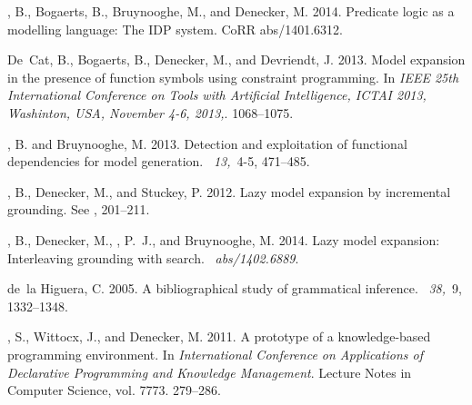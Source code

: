 \documentclass{tlp}
\renewcommand{\|}{\ensuremath{\,|\,}}
\renewcommand{\|}{\,|\,}
\begin{document}
\begin{thebibliography}{}
{, B.}, {\sc Bogaerts, B.}, {\sc Bruynooghe, M.}, {\sc and} {\sc
  Denecker, M.} 2014.
\newblock Predicate logic as a modelling language: {T}he {IDP} system.
\newblock CoRR abs/1401.6312.

{\sc De~Cat, B.}, {\sc Bogaerts, B.}, {\sc Denecker, M.}, {\sc and} {\sc
  Devriendt, J.} 2013.
\newblock Model expansion in the presence of function symbols using constraint
  programming.
\newblock In {\em IEEE 25th International Conference on Tools with Artificial
  Intelligence, ICTAI 2013, Washinton, USA, November 4-6, 2013,}. 1068--1075.

{, B.} {\sc and} {\sc Bruynooghe, M.} 2013.
\newblock Detection and exploitation of functional dependencies for model
  generation.
~{\em 13,\/}~4-5,
  471--485.

{, B.}, {\sc Denecker, M.}, {\sc and} {\sc Stuckey, P.} 2012.
\newblock Lazy model expansion by incremental grounding.
\newblock See , 201--211.

{, B.}, {\sc Denecker, M.}, {, P.~J.}, {\sc and} {\sc
  Bruynooghe, M.} 2014.
\newblock Lazy model expansion: {I}nterleaving grounding with search.
~{\em abs/1402.6889}.

{\sc de~la Higuera, C.} 2005.
\newblock A bibliographical study of grammatical inference.
~{\em 38,\/}~9, 1332--1348.

{, S.}, {\sc Wittocx, J.}, {\sc and} {\sc Denecker, M.} 2011.
\newblock A prototype of a knowledge-based programming environment.
\newblock In {\em International Conference on Applications of Declarative
  Programming and Knowledge Management}. Lecture Notes in Computer Science,
  vol. 7773. 279--286.


\end{thebibliography}
\end{document}
